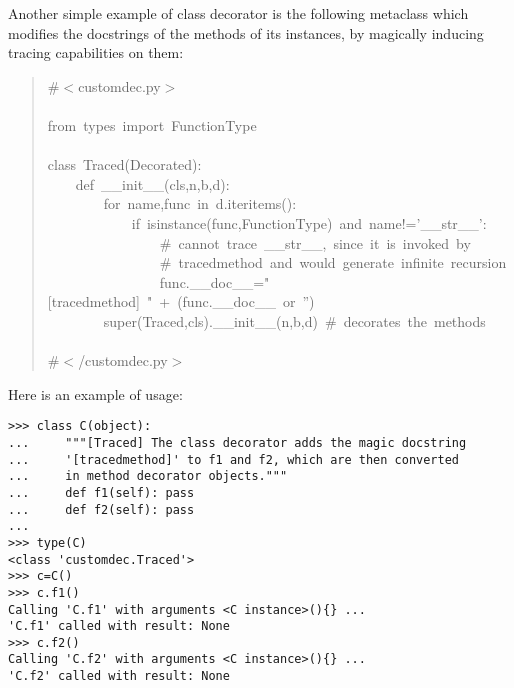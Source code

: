 \documentclass[11pt,english]{article}
\begin{document}
Another simple example of class decorator is the following metaclass 
which modifies the docstrings of the methods of its instances, 
by magically inducing tracing capabilities on them:
\begin{quote}
\begin{ttfamily}\begin{flushleft}
\mbox{{\#}{$<$}customdec.py{$>$}}\\
\mbox{}\\
\mbox{from~types~import~FunctionType~~}\\
\mbox{}\\
\mbox{class~Traced(Decorated):}\\
\mbox{~~~~def~{\_}{\_}init{\_}{\_}(cls,n,b,d):}\\
\mbox{~~~~~~~~for~name,func~in~d.iteritems():}\\
\mbox{~~~~~~~~~~~~if~isinstance(func,FunctionType)~and~name!='{\_}{\_}str{\_}{\_}':~}\\
\mbox{~~~~~~~~~~~~~~~~{\#}~cannot~trace~{\_}{\_}str{\_}{\_},~since~it~is~invoked~by}\\
\mbox{~~~~~~~~~~~~~~~~{\#}~tracedmethod~and~would~generate~infinite~recursion}\\
\mbox{~~~~~~~~~~~~~~~~func.{\_}{\_}doc{\_}{\_}="[tracedmethod]~"~+~(func.{\_}{\_}doc{\_}{\_}~or~'')}\\
\mbox{~~~~~~~~super(Traced,cls).{\_}{\_}init{\_}{\_}(n,b,d)~{\#}~decorates~the~methods}\\
\mbox{}\\
\mbox{{\#}{$<$}/customdec.py{$>$}}
\end{flushleft}\end{ttfamily}
\end{quote}

Here is an example of usage:
\begin{verbatim}>>> class C(object):
...     """[Traced] The class decorator adds the magic docstring
...     '[tracedmethod]' to f1 and f2, which are then converted 
...     in method decorator objects."""
...     def f1(self): pass
...     def f2(self): pass
...
>>> type(C)
<class 'customdec.Traced'>
>>> c=C()
>>> c.f1()
Calling 'C.f1' with arguments <C instance>(){} ...
'C.f1' called with result: None
>>> c.f2()
Calling 'C.f2' with arguments <C instance>(){} ...
'C.f2' called with result: None\end{verbatim}
\end{document}
